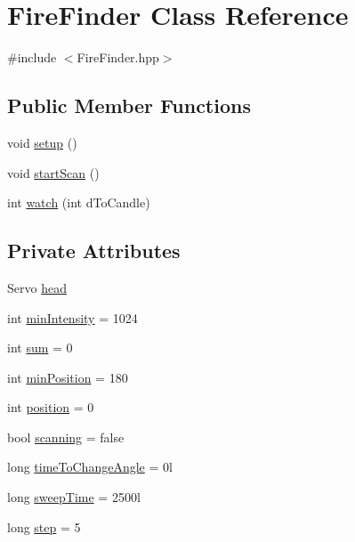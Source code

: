 \hypertarget{classFireFinder}{\section{Fire\-Finder Class Reference}
\label{classFireFinder}
}


{\ttfamily \#include $<$Fire\-Finder.\-hpp$>$}

\subsection*{Public Member Functions}
\begin{DoxyCompactItemize}
\item 
void \hyperlink{classFireFinder_aaa2beb5a87e2d9dbd83c0dee1f4f1ef0}{setup} ()
\item 
void \hyperlink{classFireFinder_ab2cddefdf1200e176231a601a3a1ede3}{start\-Scan} ()
\item 
int \hyperlink{classFireFinder_a8521d3f518599280ff0c671905c91820}{watch} (int d\-To\-Candle)
\end{DoxyCompactItemize}
\subsection*{Private Attributes}
\begin{DoxyCompactItemize}
\item 
Servo \hyperlink{classFireFinder_ac6a7b4e986e63cddb3f010e8909c00f8}{head}
\item 
int \hyperlink{classFireFinder_a7d3912a911843b60de3468588cfe8579}{min\-Intensity} = 1024
\item 
int \hyperlink{classFireFinder_a84926ae7c01b8c03bb87c810136a41ff}{sum} = 0
\item 
int \hyperlink{classFireFinder_ad8be0837d88f10d65b6f8a405f29494a}{min\-Position} = 180
\item 
int \hyperlink{classFireFinder_a40e204a2807939b3195024f14a9278fc}{position} = 0
\item 
bool \hyperlink{classFireFinder_aec1a3ae4b80847a907898601c64386cb}{scanning} = false
\item 
long \hyperlink{classFireFinder_a97b1a598ddb7886feb4a96a4931cc103}{time\-To\-Change\-Angle} = 0l
\item 
long \hyperlink{classFireFinder_aaa38192d82bc4120129b72fee61f72f1}{sweep\-Time} = 2500l
\item 
long \hyperlink{classFireFinder_ad482526cf32997919cbc31f61d12065d}{step} = 5
\end{DoxyCompactItemize}
